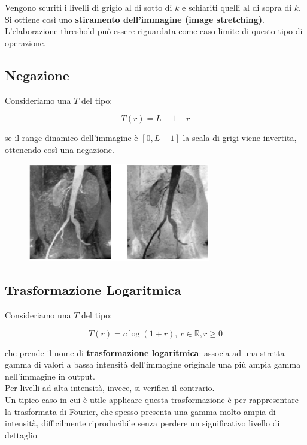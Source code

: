 Vengono scuriti i livelli di grigio al di sotto di $k$ e schiariti quelli al di
sopra di $k$. Si ottiene così uno \textbf{stiramento dell'immagine (image
    stretching)}. L'elaborazione threshold può essere riguardata come caso limite di
questo tipo di operazione.

\subsection{Negazione}

Consideriamo una $T$ del tipo:

$$
    T(r) = L - 1 - r
$$

se il range dinamico dell'immagine è $[0, L - 1]$ la scala di grigi viene
invertita, ottenendo così una negazione.

\begin{figure}[H]
    \centering
    \includegraphics[width=8cm, keepaspectratio]{capitoli/immagini/imgs/angiografie_esempio_3.jpg}
\end{figure}

\subsection{Trasformazione Logaritmica}

Consideriamo una $T$ del tipo:

$$
    T(r) = c \log(1 + r), \ c \in  \mathbb{R}, r \geq 0
$$

che prende il nome di \textbf{trasformazione logaritmica}: associa ad una
stretta gamma di valori a bassa intensità dell'immagine originale una più ampia
gamma nell'immagine in output.\\
Per livelli ad alta intensità, invece, si verifica il contrario.\\
Un tipico caso in cui è utile applicare questa trasformazione è per
rappresentare la trasformata di Fourier, che spesso presenta una gamma molto
ampia di intensità, difficilmente riproducibile senza perdere un significativo
livello di dettaglio

